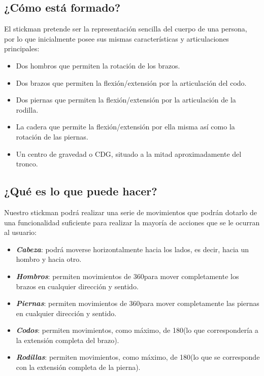 \documentclass[a4paper,12pt]{article}
\begin{document}
    \subsection{¿Cómo está formado?}
    El stickman pretende ser la representación sencilla del cuerpo de una persona, por lo que inicialmente posee sus mismas características y 
    articulaciones principales:
    \begin{itemize}
      \item Dos hombros que permiten la rotación de los brazos.
      \item Dos brazos que permiten la flexión/extensión por la articulación del codo.
      \item Dos piernas que permiten la flexión/extensión por la articulación de la rodilla.
      \item La cadera que permite la flexión/extensión por ella misma así como la rotación de las piernas.
      \item Un centro de gravedad o CDG, situado a la mitad aproximadamente del tronco.\\
    \end{itemize}
    
    \subsection{¿Qué es lo que puede hacer?}
    Nuestro stickman podrá realizar una serie de movimientos que podrán dotarlo de una funcionalidad suficiente para realizar la mayoría de acciones
    que se le ocurran al usuario:
    \begin{itemize}
      \item \textbf{\textit{Cabeza}}: podrá moverse horizontalmente hacia los lados, es decir, hacia un hombro y hacia otro.
      \item \textbf{\textit{Hombros}}: permiten movimientos de 360\textdegree para mover completamente los brazos en cualquier dirección y sentido.
      \item \textbf{\textit{Piernas}}: permiten movimientos de 360\textdegree para mover completamente las piernas en cualquier dirección y sentido.
      \item \textbf{\textit{Codos}}: permiten movimientos, como máximo, de 180\textdegree (lo que correspondería a la extensión completa del brazo).
      \item \textbf{\textit{Rodillas}}: permiten movimientos, como máximo, de 180\textdegree (lo que se corresponde con la extensión completa de la
	    pierna).\\
    \end{itemize}
    
\end{document}
